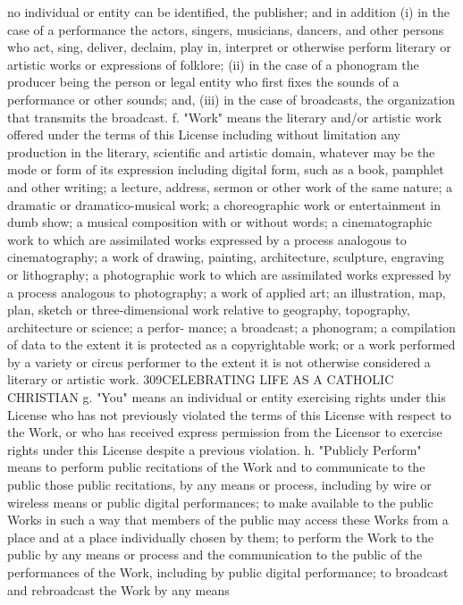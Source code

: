 \documentclass[oneside]{book}
\begin{document}
no individual or entity can be identified, the publisher; and in addition (i) in
the case of a performance the actors, singers, musicians, dancers, and other
persons who act, sing, deliver, declaim, play in, interpret or otherwise perform
literary or artistic works or expressions of folklore; (ii) in the case of a
phonogram the producer being the person or legal entity who first fixes the
sounds of a performance or other sounds; and, (iii) in the case of broadcasts,
the organization that transmits the broadcast.  f. "Work" means the literary
and/or artistic work offered under the terms of this License including without
limitation any production in the literary, scientific and artistic domain,
whatever may be the mode or form of its expression including digital form, such
as a book, pamphlet and other writing; a lecture, address, sermon or other work
of the same nature; a dramatic or dramatico-musical work; a choreographic work
or entertainment in dumb show; a musical composition with or without words; a
cinematographic work to which are assimilated works expressed by a process
analogous to cinematography; a work of drawing, painting, architecture,
sculpture, engraving or lithography; a photographic work to which are
assimilated works expressed by a process analogous to photography; a work of
applied art; an illustration, map, plan, sketch or three-dimensional work
relative to geography, topography, architecture or science; a perfor- mance; a
broadcast; a phonogram; a compilation of data to the extent it is protected as a
copyrightable work; or a work performed by a variety or circus performer to the
extent it is not otherwise considered a literary or artistic work.
309CELEBRATING LIFE AS A CATHOLIC CHRISTIAN g. "You" means an individual or
entity exercising rights under this License who has not previously violated the
terms of this License with respect to the Work, or who has received express
permission from the Licensor to exercise rights under this License despite a
previous violation.  h. "Publicly Perform" means to perform public recitations
of the Work and to communicate to the public those public recitations, by any
means or process, including by wire or wireless means or public digital
performances; to make available to the public Works in such a way that members
of the public may access these Works from a place and at a place individually
chosen by them; to perform the Work to the public by any means or process and
the communication to the public of the performances of the Work, including by
public digital performance; to broadcast and rebroadcast the Work by any means
\end{document}
